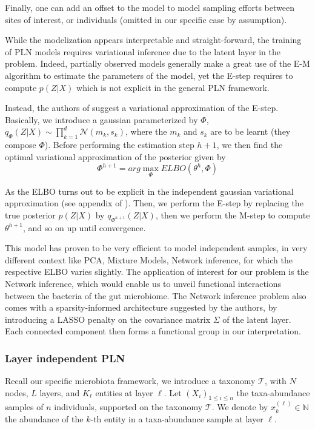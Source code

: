 Finally, one can add an offset to the model to model sampling efforts between sites of interest, or individuals (omitted in our specific case by assumption).

\medskip

While the modelization appears interpretable and straight-forward, the training of PLN models requires variational inference due to the latent layer in the problem.
Indeed, partially observed models generally make a great use of the E-M algorithm to estimate the parameters of the model, yet the E-step requires to compute $p(Z|X)$
which is not explicit in the general PLN framework.

\medskip

Instead, the authors of \cite{PLN_chiquet} suggest a variational approximation of the E-step.
Basically, we introduce a gaussian parameterized by $\Phi$, $q_{\Phi}(Z|X) \sim \prod_{k=1}^d \mathcal{N}(m_k, s_k)$, where the $m_k$ and $s_k$ are to be learnt (they compose $\Phi$).
Before performing the estimation step $h+1$, we then find the optimal variational approximation of the posterior given by
$$\Phi^{h+1} = arg\max_{\Phi} ELBO(\theta^h, \Phi)$$

As the ELBO turns out to be explicit in the independent gaussian variational approximation (see appendix of \cite{PLN_chiquet}).
Then, we perform the E-step by replacing the true posterior $p(Z|X)$ by $q_{\Phi^{h+1}}(Z|X)$, then we perform the M-step to compute $\theta^{h+1}$, and so on up until convergence.

\medskip

This model has proven to be very efficient to model independent samples, in very different context like PCA, Mixture Models, Network inference, for which the respective ELBO varies slightly.
The application of interest for our problem is the Network inference, which would enable us to unveil functional interactions between the bacteria of the gut microbiome.
The Network inference problem also comes with a sparsity-informed architecture suggested by the authors, by introducing a LASSO penalty on the covariance matrix $\Sigma$ of the latent layer.
Each connected component then forms a functional group in our interpretation. 

\subsubsection{Layer independent PLN}

Recall our specific microbiota framework, we introduce a taxonomy $\mathcal{T}$, with $N$ nodes, $L$ layers, and $K_{\ell}$ entities at layer $\ell$.
Let $(X_i)_{1 \leq i \leq n}$ the taxa-abundance samples of $n$ individuals, supported on the taxonomy $\mathcal{T}$.
We denote by $x_k^{(\ell)} \in \mathbb{N}$ the abundance of the $k$-th entity in a taxa-abundance sample at layer $\ell$.

